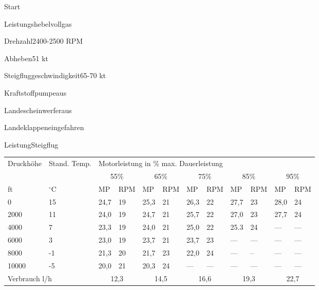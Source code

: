   \begin{checklist}{Start}
    \item{Leistungshebel}{vollgas}
    \item{Drehzahl}{2400-2500 RPM}
    \item{Abheben}{51 kt}
    \item{Steigfluggeschwindigkeit}{65-70 kt}
  
    \item{Kraftstoffpumpe}{aus}
    \item{Landescheinwerfer}{aus}
    \item{Landeklappen}{eingefahren}
    \item{Leistung}{Steigflug}
  \end{checklist}

\begin{table*}[t]
  \centering
  \begin{tabular}{@{}ll|ll|ll|ll|ll|ll@{}}
    \multirow{2}{*}{Druckhöhe} &
      \multirow{2}{*}{Stand. Temp.} &
      \multicolumn{10}{l}{Motorleistung in \% max. Dauerleistung} \\ \cmidrule(l){3-12} 
     &
       &
      \multicolumn{2}{c}{55\%} &
      \multicolumn{2}{c}{65\%} &
      \multicolumn{2}{c}{75\%} &
      \multicolumn{2}{c}{85\%} &
      \multicolumn{2}{c}{95\%} \\ \cmidrule(r){1-2}
    ft    & $^{\circ}$C & MP   & RPM & MP   & RPM & MP   & RPM & MP   & RPM & MP   & RPM \\
    0     & 15 & 24,7 & 19  & 25,3 & 21  & 26,3 & 22  & 27,7 & 23  & 28,0 & 24  \\\hline
    2000  & 11 & 24,0 & 19  & 24,7 & 21  & 25,7 & 22  & 27,0 & 23  & 27,7 & 24  \\\hline
    4000  & 7  & 23,3 & 19  & 24,0 & 21  & 25,0 & 22  & 25.3 & 24  & ---  & --- \\\hline
    6000  & 3  & 23,0 & 19  & 23,7 & 21  & 23,7 & 23  & ---  & --- & ---  & --- \\\hline
    8000  & -1 & 21,3 & 20  & 21,7 & 23  & 22,0 & 24  & ---  & --  & ---  & --- \\\hline
    10000 & -5 & 20,0 & 21  & 20,3 & 24  & ---  & --- & ---  & --- & ---  & --- \\\hline
    \multicolumn{2}{l}{Verbrauch l/h} &
      \multicolumn{2}{c}{12,3} &
      \multicolumn{2}{c}{14,5} &
      \multicolumn{2}{c}{16,6} &
      \multicolumn{2}{c}{19,3} &
      \multicolumn{2}{c}{22,7}
    \end{tabular}
\end{table*}

